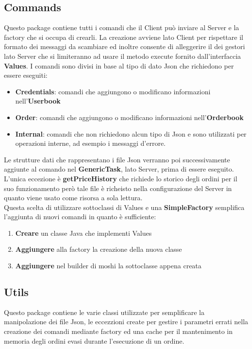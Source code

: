 \documentclass{article}
\begin{document}
\subsection{Commands}
Questo package contiene tutti i comandi che il Client può inviare al Server e la factory che si occupa di crearli. La creazione avviene lato Client per rispettare il formato dei messaggi da scambiare ed inoltre consente di alleggerire il dei gestori lato Server che si limiteranno ad usare il metodo execute fornito dall'interfaccia \textbf{Values}.
I comandi sono divisi in base al tipo di dato Json che richiedono per essere eseguiti:
\begin{itemize}
  \item \textbf{Credentials}: comandi che aggiungono o modificano informazioni nell'\textbf{Userbook}
  \item \textbf{Order}: comandi che aggiungono o modificano informazioni nell'\textbf{Orderbook}
  \item \textbf{Internal}: comandi che non richiedono alcun tipo di Json e sono utilizzati per operazioni interne, ad esempio i messaggi d'errore.
\end{itemize}
Le strutture dati che rappresentano i file Json verranno poi successivamente aggiunte al comando nel \textbf{GenericTask}, lato Server, prima di essere eseguito.\\
L'unica eccezione è \textbf{getPriceHistory} che richiede lo storico degli ordini per il suo funzionamento però tale file è richeisto nella configurazione del Server in quanto viene usato come risorsa a sola lettura. 
\\Questa scelta di utilizzare sottoclassi di Values e una \textbf{SimpleFactory} semplifica l'aggiunta di nuovi comandi in quanto è sufficiente:
\begin{enumerate}
  \item \textbf{Creare} un classe Java che implementi Values
  \item \textbf{Aggiungere} alla factory la creazione della nuova classe
  \item \textbf{Aggiungere} nel builder di moshi la sottoclasse appena creata
\end{enumerate}

\subsection{Utils}
Questo package contiene le varie classi utilizzate per semplificare la manipolazione dei file Json, le eccezzioni create per gestire i parametri errati nella creazione dei comandi mediante factory ed una cache per il mantenimento in memoria degli ordini evasi durante l'esecuzione di un ordine.
\newpage
\end{document}
